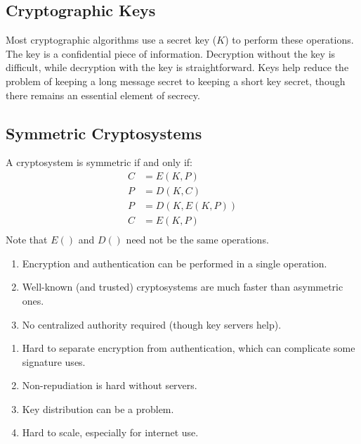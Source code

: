 \documentclass{report}
\begin{document}
\subsection{Cryptographic Keys}
Most cryptographic algorithms use a secret key ($K$) to perform these operations. The
key is a confidential piece of information. Decryption without the key is difficult, while
decryption with the key is straightforward. Keys help reduce the problem of keeping a long message
secret to keeping a short key secret, though there remains an essential element of secrecy. 


\subsection{Symmetric Cryptosystems}
A cryptosystem is symmetric if and only if:
\begin{align*}
  C &= E(K, P) \\
  P &= D(K, C) \\
  P &= D(K, E(K, P)) \\
  C &= E(K, P) \\
\end{align*}
Note that $E()$ and $D()$ need not be the same operations.

\begin{tcbraster}[raster columns=2, raster equal height, raster force size=false]
  \begin{tcolorbox}[colback=green!5!white,colframe=black!75!green,title=Advantages]
    \begin{enumerate}[label=\textit{(\roman*)}]
    \item Encryption and authentication can be performed in a single operation.
    \item Well-known (and trusted) cryptosystems are much faster than asymmetric ones.
    \item No centralized authority required (though key servers help).
    \end{enumerate}
  \end{tcolorbox}
  \begin{tcolorbox}[colback=red!5!white,colframe=black!40!red,title=Disadvantages]
    \begin{enumerate}[label=\textit{(\roman*)}]
    \item Hard to separate encryption from authentication, which can complicate some signature uses.
    \item Non-repudiation is hard without servers.
    \item Key distribution can be a problem.
    \item Hard to scale, especially for internet use.
    \end{enumerate}
  \end{tcolorbox}
\end{tcbraster}
\end{document}
